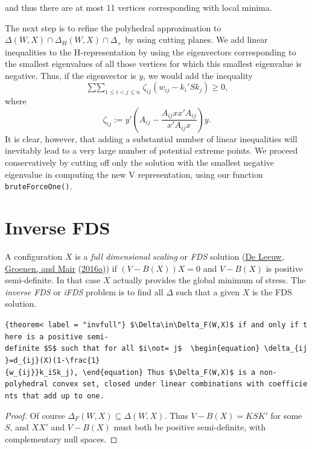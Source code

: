 \documentclass[
  12pt,
]{book}
\theoremstyle{definition}
\theoremstyle{definition}
\theoremstyle{definition}
\theoremstyle{definition}
\theoremstyle{remark}
\begin{document}
and thus there are at most 11 vertices corresponding with local minima.

The next step is to refine the polyhedral approximation to \(\Delta(W,X)\cap\Delta_H(W,X)\cap\Delta_+\) by using cutting planes. We add linear inequalities to the H-representation by using the eigenvectors corresponding to the smallest eigenvalues of all
those vertices for which this smallest eigenvalue is negative. Thus, if the eigenvector is \(y\), we would add the inequality
\begin{equation}
\mathop{\sum\sum}_{1\leq i<j\leq n}\zeta_{ij}(w_{ij}-k_i'Sk_j)\geq 0,
\end{equation}
where
\[
\zeta_{ij}:=y'\left(A_{ij}-\frac{A_{ij}xx'A_{ij}}{x'A_{ij}x}\right)y.
\]
It is clear, however, that adding a substantial number of linear inequalities will inevitably lead to a very large number of potential extreme points. We proceed conservatively by cutting off only the solution with the smallest negative eigenvalue in computing the new V representation, using our function \texttt{bruteForceOne()}.

\hypertarget{inverse-fds}{%
\section{Inverse FDS}\label{inverse-fds}}

A configuration \(X\) is a \emph{full dimensional scaling} or \emph{FDS} solution (\protect\hyperlink{ref-deleeuw_groenen_mair_E_16e}{De Leeuw, Groenen, and Mair} (\protect\hyperlink{ref-deleeuw_groenen_mair_E_16e}{2016a})) if \((V-B(X))X=0\) and \(V-B(X)\) is positive semi-definite. In that case \(X\) actually provides the global minimum of stress. The \emph{inverse FDS} or \emph{iFDS} problem is to find all \(\Delta\) such that a given \(X\) is the FDS solution.

\texttt{\{theorem\textless{}\ label\ =\ "invfull"\}\ \$\textbackslash{}Delta\textbackslash{}in\textbackslash{}Delta\_F(W,X)\$\ if\ and\ only\ if\ there\ is\ a\ positive\ semi-definite\ \$S\$\ such\ that\ for\ all\ \$i\textbackslash{}not=\ j\$\ \ \textbackslash{}begin\{equation\}\ \textbackslash{}delta\_\{ij\}=d\_\{ij\}(X)(1-\textbackslash{}frac\{1\}\{w\_\{ij\}\}k\_i\textquotesingle{}Sk\_j),\ \textbackslash{}end\{equation\}\ Thus\ \$\textbackslash{}Delta\_F(W,X)\$\ is\ a\ non-polyhedral\ convex\ set,\ closed\ under\ linear\ combinations\ with\ coefficients\ that\ add\ up\ to\ one.}

\begin{proof}
Of course \(\Delta_F(W,X)\subseteq\Delta(W,X)\). Thus \(V-B(X)=KSK'\) for some \(S\), and \(XX'\) and \(V-B(X)\) must both be positive semi-definite, with complementary null spaces.
\end{proof}
\end{document}
